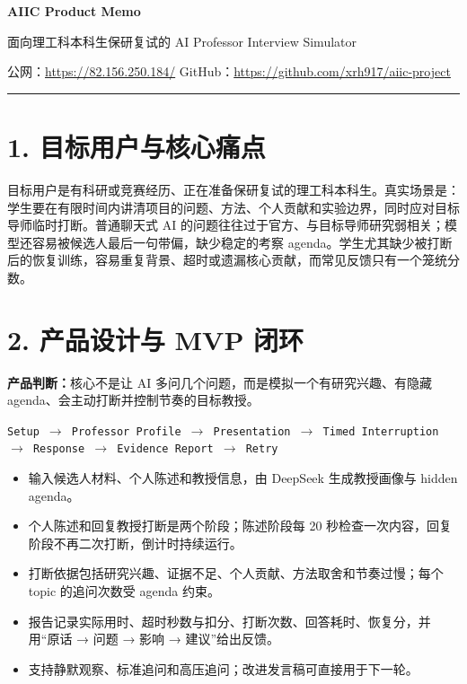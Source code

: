 \documentclass[UTF8,10pt,a4paper]{ctexart}
\begin{document}
\begin{center}
{\LARGE\bfseries AIIC Product Memo}\par
\vspace{2pt}
{\small 面向理工科本科生保研复试的 AI Professor Interview Simulator}\par
{\footnotesize 公网：\url{https://82.156.250.184/} \quad GitHub：\url{https://github.com/xrh917/aiic-project}}
\end{center}
\hrule\vspace{4pt}

\section*{1. 目标用户与核心痛点}
目标用户是有科研或竞赛经历、正在准备保研复试的理工科本科生。真实场景是：学生要在有限时间内讲清项目的问题、方法、个人贡献和实验边界，同时应对目标导师临时打断。普通聊天式 AI 的问题往往过于官方、与目标导师研究弱相关；模型还容易被候选人最后一句带偏，缺少稳定的考察 agenda。学生尤其缺少被打断后的恢复训练，容易重复背景、超时或遗漏核心贡献，而常见反馈只有一个笼统分数。

\section*{2. 产品设计与 MVP 闭环}
\textbf{产品判断：}核心不是让 AI 多问几个问题，而是模拟一个有研究兴趣、有隐藏 agenda、会主动打断并控制节奏的目标教授。

\begin{center}\small
\texttt{Setup $\rightarrow$ Professor Profile $\rightarrow$ Presentation $\rightarrow$ Timed Interruption $\rightarrow$ Response $\rightarrow$ Evidence Report $\rightarrow$ Retry}
\end{center}
\begin{itemize}
\item 输入候选人材料、个人陈述和教授信息，由 DeepSeek 生成教授画像与 hidden agenda。
\item 个人陈述和回复教授打断是两个阶段；陈述阶段每 20 秒检查一次内容，回复阶段不再二次打断，倒计时持续运行。
\item 打断依据包括研究兴趣、证据不足、个人贡献、方法取舍和节奏过慢；每个 topic 的追问次数受 agenda 约束。
\item 报告记录实际用时、超时秒数与扣分、打断次数、回答耗时、恢复分，并用“原话 → 问题 → 影响 → 建议”给出反馈。
\item 支持静默观察、标准追问和高压追问；改进发言稿可直接用于下一轮。
\end{itemize}
\end{document}
